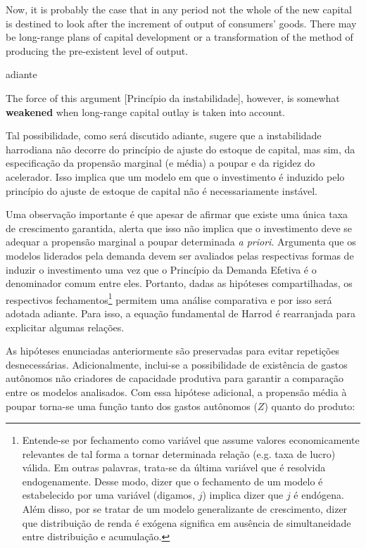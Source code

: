 \begin{citacao}
Now, it is probably the case that in any period not the whole of the new capital is destined to look after the increment of output of consumers' goods. There may be  long-range plans of capital development or a transformation  of the method of  producing  the pre-existent level of output. \cite[p.~17]{harrod_essay_1939}
\end{citacao}
adiante
\begin{citacao}
The force  of this  argument [Princípio da instabilidade], however, is somewhat \textbf{weakened} when long-range  capital outlay is taken into account.
\cite[p.~26, grifos adicionados]{harrod_essay_1939}
\end{citacao}
Tal possibilidade, como será discutido adiante, sugere que a instabilidade harrodiana não decorre do princípio de ajuste do estoque de capital, mas sim, da especificação da propensão marginal (e média) a poupar e da rigidez do acelerador. Isso implica que um modelo em que o investimento é induzido pelo princípio do ajuste de estoque de capital não é necessariamente instável.

Uma observação importante é que apesar de \textcite[p.~23]{harrod_essay_1939} afirmar que existe uma única taxa de crescimento garantida, \textcite[p.~83]{robinson_model_1962} alerta que isso não implica que o investimento %
deve se adequar a propensão marginal a poupar determinada \textit{a priori}. Argumenta que os modelos liderados pela demanda devem ser avaliados pelas respectivas formas de induzir o investimento uma vez que o Princípio da Demanda Efetiva é o denominador comum entre eles. Portanto, dadas as hipóteses compartilhadas, os respectivos  fechamentos\footnote{Entende-se por fechamento como variável que assume valores economicamente relevantes de tal forma a tornar determinada relação (e.g. taxa de lucro) válida. Em outras palavras, trata-se da última variável que é resolvida endogenamente. Desse modo, dizer que o fechamento de um modelo é estabelecido por uma variável (digamos, $j$) implica dizer que $j$ é endógena. Além disso, por se tratar de um modelo generalizante de crescimento, dizer que distribuição de renda é exógena significa em ausência de simultaneidade entre distribuição e acumulação.} permitem uma análise comparativa e por isso será adotada adiante. Para isso, a equação fundamental de Harrod é rearranjada para explicitar algumas relações.


As hipóteses enunciadas anteriormente são preservadas para evitar repetições desnecessárias. Adicionalmente, inclui-se a possibilidade de existência de gastos autônomos não criadores de capacidade produtiva para garantir a comparação entre os modelos analisados. Com essa hipótese adicional, a propensão média à poupar torna-se uma função tanto dos gastos autônomos ($Z$) quanto do produto:

